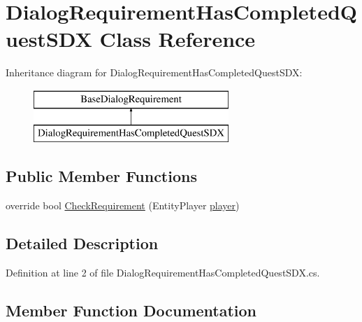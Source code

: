 \hypertarget{class_dialog_requirement_has_completed_quest_s_d_x}{}\section{Dialog\+Requirement\+Has\+Completed\+Quest\+S\+DX Class Reference}
\label{class_dialog_requirement_has_completed_quest_s_d_x}
Inheritance diagram for Dialog\+Requirement\+Has\+Completed\+Quest\+S\+DX\+:\begin{figure}[H]
\begin{center}
\leavevmode
\includegraphics[height=2.000000cm]{class_dialog_requirement_has_completed_quest_s_d_x}
\end{center}
\end{figure}
\subsection*{Public Member Functions}
\begin{DoxyCompactItemize}
\item 
override bool \mbox{\hyperlink{class_dialog_requirement_has_completed_quest_s_d_x_ad56a73dc295421e4c6ba3cdb0cccfa67}{Check\+Requirement}} (Entity\+Player \mbox{\hyperlink{_sphere_i_i_01_music_01_boxes_2_config_2_localization_8txt_a4e2cb8aeff651600ea1cc57fe5a929a4}{player}})
\end{DoxyCompactItemize}


\subsection{Detailed Description}


Definition at line 2 of file Dialog\+Requirement\+Has\+Completed\+Quest\+S\+D\+X.\+cs.



\subsection{Member Function Documentation}
\mbox{\label{class_dialog_requirement_has_completed_quest_s_d_x_ad56a73dc295421e4c6ba3cdb0cccfa67}} 
